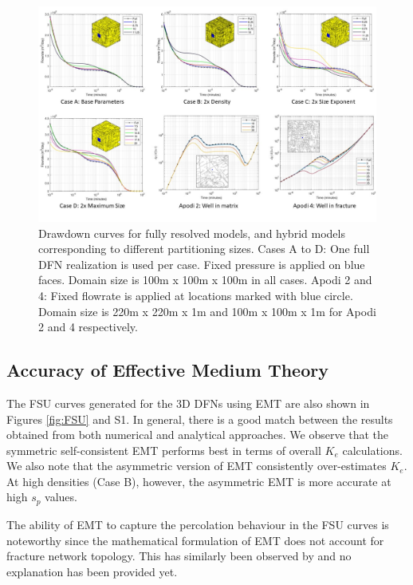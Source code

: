 \documentclass[draft]{agujournal2018}
\begin{document}
\begin{figure}[h]
	\centering
	
	\includegraphics[width=\textwidth]{DD_main.jpg}
	
	\caption{Drawdown curves for fully resolved models, and hybrid models corresponding to different partitioning sizes. Cases A to D: One full DFN realization is used per case. Fixed pressure is applied on blue faces. Domain size is 100m x 100m x 100m in all cases. Apodi 2 and 4: Fixed flowrate is applied at locations marked with blue circle. Domain size is 220m x 220m x 1m and 100m x 100m x 1m for Apodi 2 and 4 respectively.}
	\label{fig:DD}
\end{figure}

\subsection{Accuracy of Effective Medium Theory}
The FSU curves generated for the 3D DFNs using EMT are also shown in Figures \ref{fig:FSU} and S1. In general, there is a good match between the results obtained from both numerical and analytical approaches. We observe that the symmetric self-consistent EMT performs best in terms of overall $K_e$ calculations. We also note that the asymmetric version of EMT consistently over-estimates $K_e$. At high densities (Case B), however, the asymmetric EMT is more accurate at high $s_p$ values. 

The ability of EMT to capture the percolation behaviour in the FSU curves is noteworthy since the mathematical formulation of EMT does not account for fracture network topology. This has similarly been observed by \citet{Saevik2013} and no explanation has been provided yet.
\end{document}

